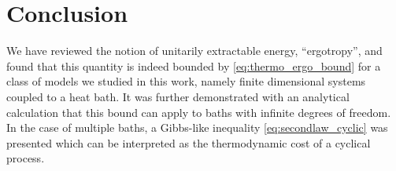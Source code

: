
\section{Conclusion}
\label{sec:conclusion-2}

We have reviewed the notion of unitarily extractable energy,
``ergotropy'', and found that this quantity is indeed bounded by
\cref{eq:thermo_ergo_bound} for a class of models we studied in this
work, namely finite dimensional systems coupled to a heat bath. It was
further demonstrated with an analytical calculation that this bound
can apply to baths with infinite degrees of freedom. In the case of
multiple baths, a Gibbs-like inequality \cref{eq:secondlaw_cyclic} was
presented which can be interpreted as the thermodynamic cost of a
cyclical process.

